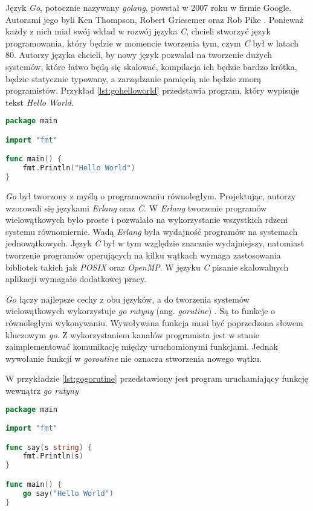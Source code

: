 Język \textsl{Go}, potocznie nazywany \textsl{golang}, powstał w 2007 roku w firmie Google. Autorami jego byli Ken Thompson, Robert Griesemer oraz Rob Pike \cite{programmingingo}. Ponieważ każdy z nich miał swój wkład w rozwój języka \textsl{C}, chcieli  stworzyć język programowania, który będzie w momencie tworzenia tym, czym \textsl{C} był w latach 80. Autorzy języka chcieli, by nowy język pozwalał na tworzenie dużych systemów, które  łatwo będą się skalować, kompilacja ich będzie bardzo krótka, będzie statycznie typowany, a zarządzanie pamięcią nie będzie zmorą programistów. Przykład \ref{lst:gohelloworld} przedstawia program, który wypisuje tekst \textsl{Hello World}.
\begin{lstlisting}[language=Go, caption={Przykład programu w języku Go}, label={lst:gohelloworld}]
package main

import "fmt"

func main() {
	fmt.Println("Hello World")
}
\end{lstlisting}

\textsl{Go} był tworzony z myślą o programowaniu równoległym. Projektując, autorzy wzorowali się językami \textsl{Erlang} oraz \textsl{C}. W \textsl{Erlang} tworzenie programów wielowątkowych było proste i pozwalało na wykorzystanie wszystkich rdzeni systemu równomiernie. Wadą  \textsl{Erlang} była wydajność programów na systemach jednowątkowych. Język \textsl{C} był w tym względzie znacznie wydajniejszy, natomiast tworzenie programów operujących na kilku wątkach wymaga zastosowania bibliotek takich jak \textsl{POSIX} oraz \textsl{OpenMP}. W języku \textsl{C} pisanie skalowalnych aplikacji wymagało dodatkowej pracy.

\textsl{Go} łączy najlepsze cechy z obu języków, a do tworzenia systemów wielowątkowych wykorzystuje \textsl{go rutyny} (ang. \textsl{gorutine}) \cite{gophrasebook}. Są to funkcje o równoległym wykonywaniu. Wywoływana funkcja musi być poprzedzona słowem kluczowym \textsl{go}. Z wykorzystaniem kanałów programista jest w stanie zaimplementować komunikację między uruchomionymi funkcjami. Jednak wywołanie funkcji w \textsl{goroutine} nie oznacza stworzenia nowego wątku. 

W przykładzie \ref{lst:gogorutine} przedstawiony jest program uruchamiający funkcję wewnątrz \textsl{go rutyny}

\begin{lstlisting}[language=Go, caption={Przykładowy program w Go wykorzystujący goroutine}, label={lst:gogorutine}]
package main

import "fmt"

func say(s string) {
	fmt.Println(s)
}

func main() {
	go say("Hello World")
}
\end{lstlisting}

